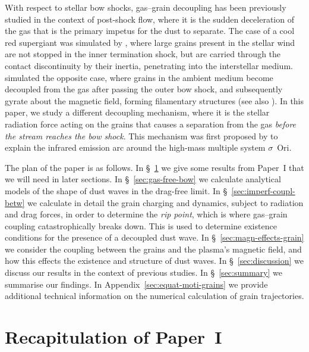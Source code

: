 \documentclass[useAMS, usenatbib, a4paper]{mnras}
\begin{document}
With respect to stellar bow shocks, gas--grain decoupling has been
previously studied in the context of post-shock flow, where it is the
sudden deceleration of the gas that is the primary impetus for the
dust to separate.  The case of a cool red supergiant was simulated by
\citet{van-Marle:2011a}, where large grains present in the stellar
wind are not stopped in the inner termination shock, but are carried
through the contact discontinuity by their inertia, penetrating into
the interstellar medium.  \citet{Katushkina:2017a} simulated the
opposite case, where grains in the ambient medium become decoupled
from the gas after passing the outer bow shock, and subsequently
gyrate about the magnetic field, forming filamentary structures (see
also \citealp{Katushkina:2018a}).  In this paper, we study a different
decoupling mechanism, where it is the stellar radiation force acting
on the grains that causes a separation from the gas \emph{before the
  stream reaches the bow shock}.  This mechanism was first proposed by
\citet{Ochsendorf:2014b} to explain the infrared emission arc around
the high-mass multiple system \(\sigma\)~Ori.

The plan of the paper is as follows.
%
In \S~\ref{sec:recap-paper-i} we give some results from Paper~I that
we will need in later sections.
%
In \S~\ref{sec:gas-free-bow} we calculate analytical models of the
shape of dust waves in the drag-free limit.
%
In \S~\ref{sec:imperf-coupl-betw} we calculate in detail the grain
charging and dynamics, subject to radiation and drag forces, in order
to determine the \textit{rip point}, which is where gas--grain coupling
catastrophically breaks down.  This is used to determine existence
conditions for the presence of a decoupled dust wave.
%
In \S~\ref{sec:magn-effects-grain} we consider the coupling between
the grains and the plasma's magnetic field, and how this effects the
existence and structure of dust waves.
%
In \S~\ref{sec:discussion} we discuss our results in the context of
previous studies.
%
In \S~\ref{sec:summary} we summarise our findings.
%
In Appendix~\ref{sec:equat-moti-grains} we provide additional
technical information on the numerical calculation of grain
trajectories.

\section{Recapitulation of Paper~I}
\label{sec:recap-paper-i}
\end{document}
